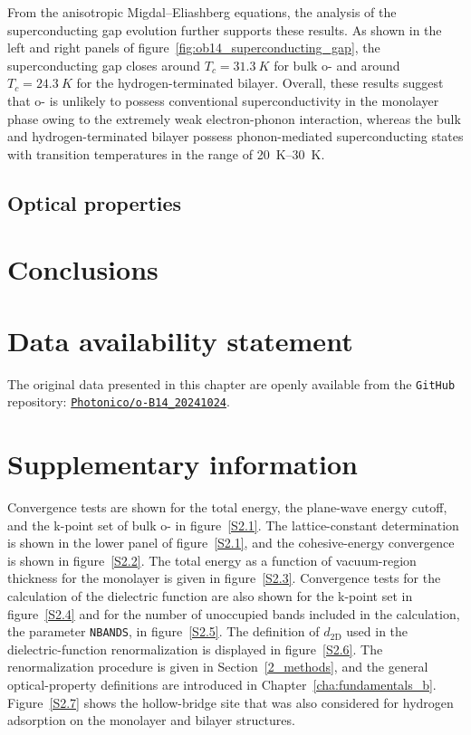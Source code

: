 From the anisotropic Migdal--Eliashberg equations,
the analysis of the superconducting gap evolution further supports these results.
As shown in the left and right panels of figure~\ref{fig:ob14_superconducting_gap},
the superconducting gap closes around $T_c=\qty{31.3}{K}$ for bulk o-
and around $T_c=\qty{24.3}{K}$ for the hydrogen-terminated bilayer.
Overall, these results suggest that o- is unlikely to possess conventional superconductivity in the monolayer phase owing to the extremely weak electron-phonon interaction,
whereas the bulk and hydrogen-terminated bilayer possess phonon-mediated superconducting states with transition temperatures in the range of \qtyrange{20}{30}{K}.

\subsection{Optical properties}
\label{2_optical}

\section{Conclusions}
\label{2_conclusions}

\section{Data availability statement}

The original data presented in this chapter are openly available from the \texttt{GitHub} repository:
\href{https://github.com/Photonico/o-B14_20241024}{\texttt{Photonico/o-B14\_20241024}}.

\section{Supplementary information}
\label{2_supplementary}

Convergence tests are shown for the total energy, the plane-wave energy cutoff,
and the k-point set of bulk o- in figure~\ref{S2.1}.
The lattice-constant determination is shown in the lower panel of figure~\ref{S2.1},
and the cohesive-energy convergence is shown in figure~\ref{S2.2}.
The total energy as a function of vacuum-region thickness for the monolayer is given in figure~\ref{S2.3}.
Convergence tests for the calculation of the dielectric function are also shown for the k-point set in figure~\ref{S2.4}
and for the number of unoccupied bands included in the calculation, the parameter \texttt{NBANDS}, in figure~\ref{S2.5}.
The definition of $d_{\mathrm{2D}}$ used in the dielectric-function renormalization is displayed in figure~\ref{S2.6}.
The renormalization procedure is given in Section~\ref{2_methods},
and the general optical-property definitions are introduced in Chapter~\ref{cha:fundamentals_b}.
Figure~\ref{S2.7} shows the hollow-bridge site that was also considered for hydrogen adsorption on the monolayer and bilayer structures.

